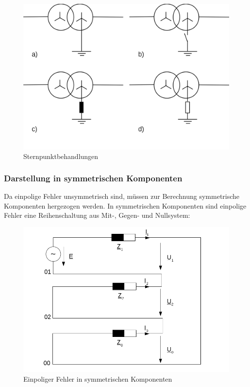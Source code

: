 \documentclass{scrartcl}
\begin{document}
\begin{onehalfspace}
	\begin{figure}[H]
	\centering
	\includegraphics[scale=0.3]{img/sternpunktbehandlung.png}
	\caption{Sternpunktbehandlungen}
	\label{sternpunktbehandlung}
	\end{figure}

\subsubsection{Darstellung in symmetrischen Komponenten}
Da einpolige Fehler unsymmetrisch sind, müssen zur Berechnung symmetrische Komponenten hergezogen werden. In symmetrischen Komponenten sind einpolige Fehler eine Reihenschaltung aus Mit-, Gegen- und Nullsystem: \\

	\begin{figure}[H]
	\centering
	\includegraphics[scale=0.6]{img/einpol-fehler.png}
	\caption{Einpoliger Fehler in symmetrischen Komponenten}
	\label{einpol-fehler}
	\end{figure}
	

\end{onehalfspace}
\end{document}
